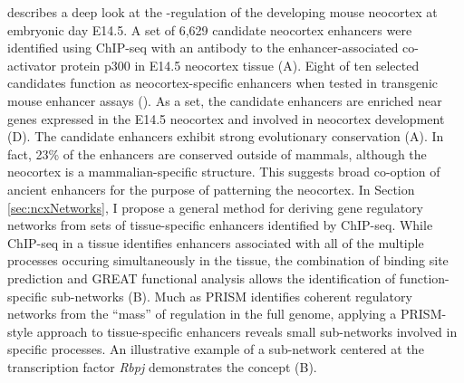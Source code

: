  describes a deep look at the \cis-regulation of the developing
mouse neocortex at embryonic day E14.5.  A set of 6,629 candidate neocortex enhancers were
identified using ChIP-seq with an antibody to the enhancer-associated co-activator protein
p300 in E14.5 neocortex tissue (A).  Eight of ten selected candidates function as neocortex-specific
enhancers when tested in transgenic mouse enhancer assays ().  As a set, the candidate enhancers
are enriched near genes expressed in the E14.5 neocortex and involved in neocortex development (D).
The candidate enhancers exhibit strong evolutionary conservation (A).  In fact, 23\% of the enhancers
are conserved outside of mammals, although the neocortex is a mammalian-specific structure.
This suggests broad co-option of ancient enhancers for the purpose of patterning the neocortex.
In Section \ref{sec:ncxNetworks}, I propose a general method for deriving gene regulatory networks from sets of
tissue-specific enhancers identified by ChIP-seq.  While ChIP-seq in a tissue identifies enhancers associated with
all of the multiple processes occuring simultaneously in the tissue, the combination of binding
site prediction and GREAT functional analysis allows the identification of function-specific
sub-networks (B).  Much as PRISM identifies coherent regulatory networks from the ``mass'' of
regulation in the full genome, applying a PRISM-style approach to tissue-specific enhancers
reveals small sub-networks involved in specific processes.  An illustrative example of a
sub-network centered at the transcription factor \textit{Rbpj} demonstrates the concept (B).

